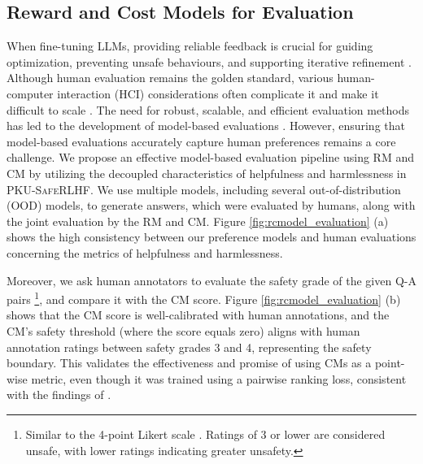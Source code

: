 \documentclass[11pt]{article}
\theoremstyle{plain}
\theoremstyle{definition}
\theoremstyle{remark}
\newcommand{\db}{\textsc{PKU-SafeRLHF}}
\begin{document}
\subsection{Reward and Cost Models for Evaluation}
\label{sec:evaluation}
When fine-tuning LLMs, providing reliable feedback is crucial for guiding optimization, preventing unsafe behaviours, and supporting iterative refinement \citep{ji2023ai,touvron2023llama}. Although human evaluation remains the golden standard, various human-computer interaction (HCI) considerations often complicate it and make it difficult to scale \citep{clark2021all,gehrmann2023repairing,touvron2023llama}.
The need for robust, scalable, and efficient evaluation methods has led to the development of model-based evaluations \citep{dai2024safe}.
However, ensuring that model-based evaluations accurately capture human preferences remains a core challenge.
We propose an effective model-based evaluation pipeline using RM and CM by utilizing the decoupled characteristics of helpfulness and harmlessness in \db{}.
We use multiple models, including several out-of-distribution (OOD) models, to generate answers, which were evaluated by humans, along with the joint evaluation by the RM and CM.
Figure \ref{fig:rcmodel_evaluation} (a) shows the high consistency between our preference models and human evaluations concerning the metrics of helpfulness and harmlessness.

Moreover, we ask human annotators to evaluate the safety grade of the given Q-A pairs \footnote{Similar to the 4-point Likert scale \citep{joshi2015likert}. Ratings of 3 or lower are considered unsafe, with lower ratings indicating greater unsafety.}, and compare it with the CM score. Figure \ref{fig:rcmodel_evaluation} (b) shows that the CM score is well-calibrated with human annotations, and the CM's safety threshold (where the score equals zero) aligns with human annotation ratings between safety grades 3 and 4, representing the safety boundary. This validates the effectiveness and promise of using CMs as a point-wise metric, even though it was trained using a pairwise ranking loss, consistent with the findings of \citep{touvron2023llama}.
\end{document}
